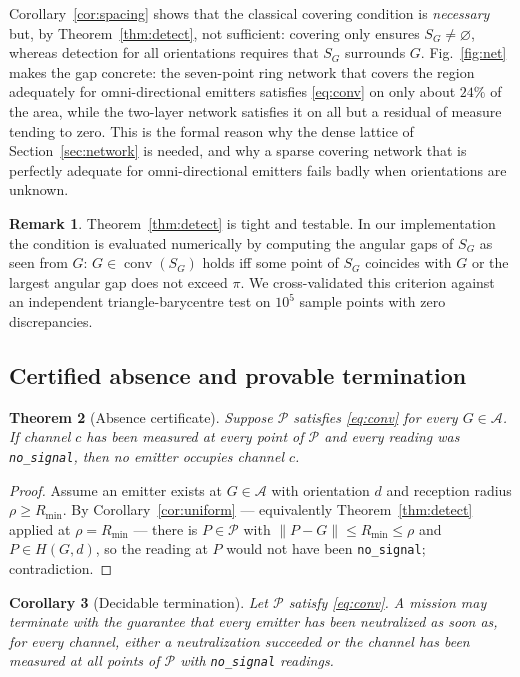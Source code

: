 \documentclass[journal,10pt]{IEEEtran}
\newtheorem{theorem}{Theorem}
\newtheorem{corollary}[theorem]{Corollary}
\theoremstyle{definition}
\newtheorem{remark}[theorem]{Remark}
\newcommand{\conv}{\operatorname{conv}}
\newcommand{\Rmin}{R_{\min}}
\newcommand{\bA}{\mathcal{A}}
\newcommand{\bP}{\mathcal{P}}
\begin{document}
Corollary~\ref{cor:spacing} shows that the classical covering condition is \emph{necessary} but,
by Theorem~\ref{thm:detect}, not sufficient: covering only ensures $S_G\ne\varnothing$, whereas
detection for all orientations requires that $S_G$ surrounds $G$. Fig.~\ref{fig:net} makes the gap
concrete: the seven-point ring network that covers the region adequately for omni-directional
emitters satisfies \eqref{eq:conv} on only about $24\%$ of the area, while the two-layer network satisfies it on all but a residual of measure tending to zero. This is the formal reason why
the dense lattice of Section~\ref{sec:network} is needed, and why a sparse covering network that
is perfectly adequate for omni-directional emitters fails badly when orientations are unknown.

\begin{remark}
Theorem~\ref{thm:detect} is tight and testable. In our implementation the condition is evaluated
numerically by computing the angular gaps of $S_G$ as seen from $G$: $G\in\conv(S_G)$ holds iff
some point of $S_G$ coincides with $G$ or the largest angular gap does not exceed $\pi$. We
cross-validated this criterion against an independent triangle-barycentre test on $10^5$ sample
points with zero discrepancies.
\end{remark}

\subsection{Certified absence and provable termination}

\begin{theorem}[Absence certificate]
\label{thm:cert}
Suppose $\bP$ satisfies \eqref{eq:conv} for every $G\in\bA$. If channel $c$ has been measured at
every point of $\bP$ and every reading was \texttt{no\_signal}, then no emitter occupies channel
$c$.
\end{theorem}
\begin{proof}
Assume an emitter exists at $G\in\bA$ with orientation $d$ and reception radius $\rho\ge\Rmin$.
By Corollary~\ref{cor:uniform} --- equivalently Theorem~\ref{thm:detect} applied at $\rho=\Rmin$ ---
there is $P\in\bP$ with $\|P-G\|\le\Rmin\le\rho$ and $P\in H(G,d)$, so the reading at $P$ would not have
been \texttt{no\_signal}; contradiction.
\end{proof}

\begin{corollary}[Decidable termination]
\label{cor:terminate}
Let $\bP$ satisfy \eqref{eq:conv}. A mission may terminate with the guarantee that every emitter
has been neutralized as soon as, for every channel, either a neutralization succeeded or the
channel has been measured at all points of $\bP$ with \texttt{no\_signal} readings.
\end{corollary}
\end{document}
